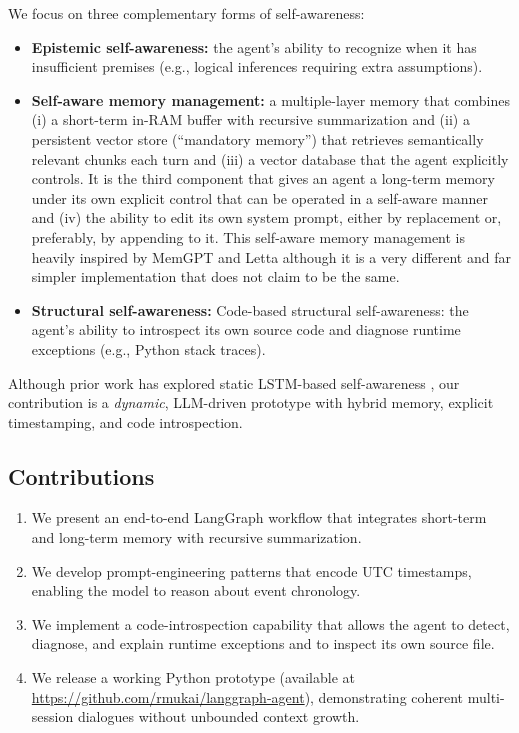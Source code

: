 \documentclass[11pt]{article}
\begin{document}
We focus on three complementary forms of self-awareness:
\begin{itemize}[leftmargin=*]
  \item \textbf{Epistemic self-awareness:} the agent’s ability to recognize when it has insufficient premises (e.g., logical inferences requiring extra assumptions).
  \item \textbf{Self-aware memory management:} a multiple-layer memory that combines (i) a short-term in-RAM buffer with recursive summarization and (ii) a persistent vector store (“mandatory memory”) that retrieves semantically relevant chunks each turn and (iii) a vector database that the agent explicitly controls.  It is the third component that gives an agent a long-term memory under its own explicit control that can be operated in a self-aware manner and (iv) the ability to edit its own system prompt, either by replacement or, preferably, by appending to it.  This self-aware memory management is heavily inspired by MemGPT and Letta \cite{letta2024} although it is a very different and far simpler implementation that does not claim to be the same.
  \item \textbf{Structural self-awareness:}  
 {Code-based structural self-awareness:} the agent’s ability to introspect its own source code and diagnose runtime exceptions (e.g., Python stack traces).
\end{itemize}

Although prior work has explored static LSTM-based self-awareness \cite{Mukai2020}, our contribution is a \emph{dynamic}, LLM-driven prototype with hybrid memory, explicit timestamping, and code introspection.

\subsection{Contributions}
\begin{enumerate}[leftmargin=*]
  \item We present an end-to-end LangGraph workflow that integrates short-term and long-term memory with recursive summarization.
  \item We develop prompt-engineering patterns that encode UTC timestamps, enabling the model to reason about event chronology.
  \item We implement a code-introspection capability that allows the agent to detect, diagnose, and explain runtime exceptions and to inspect its own source file.
  \item We release a working Python prototype (available at \url{https://github.com/rmukai/langgraph-agent}), demonstrating coherent multi-session dialogues without unbounded context growth.
\end{enumerate}
\end{document}
